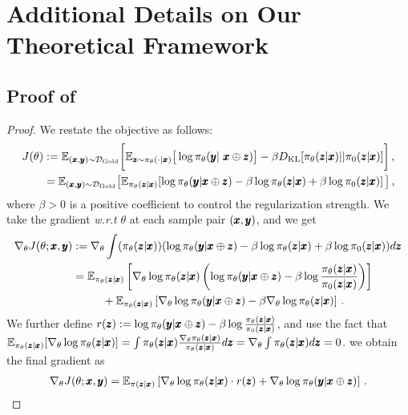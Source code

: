 \section{Additional Details on Our Theoretical Framework}
\subsection{Proof of }
\label{app:proof1}
\begin{proof}
We restate the objective as follows:
\begin{align*}
    J(\theta) &:= \mathbb{E}_{(\pmb{x}, \pmb{y})\sim \mathcal{D}_{\text{Gold}}} \bigg[\mathbb{E}_{\pmb{z} \sim \pi_{\theta}(\cdot | \pmb{x})}\big[\log \pi_{\theta}(\pmb{y} | ~\pmb{x}\oplus \pmb{z})\big]  - \beta D_{\mathrm{KL}}[\pi_\theta(\pmb{z} |\pmb{x})|| \pi_0(\pmb{z} | \pmb{x})]  \bigg]\,, \\
    & =\mathbb{E}_{(\pmb{x}, \pmb{y}) \sim \mathcal{D}_{\text{Gold}}}\big[\mathbb{E}_{\pi_\theta(\pmb{z}|\pmb{x})} [\log \pi_\theta (\pmb{y} | \pmb{x}\oplus \pmb{z}) -\beta \log \pi_\theta (\pmb{z} | \pmb{x}) + \beta \log \pi_{0}(\pmb{z} |\pmb{x})] \,\big]\,,
\end{align*}
where $\beta > 0$ is a positive coefficient to control the regularization strength.  
We take the gradient \textit{w.r.t} $\theta$ at each sample pair $(\pmb{x}, \pmb{y})$, and we get 
\begin{align*}
    \nabla_\theta J(\theta; \pmb{x}, \pmb{y}) &:= \nabla_\theta \int (\pi_\theta(\pmb{z} | \pmb{x}))( \log \pi_\theta (\pmb{y} | \pmb{x}\oplus \pmb{z}) -\beta \log \pi_\theta (\pmb{z} | \pmb{x}) + \beta\log \pi_{0}(\pmb{z} |\pmb{x}) )d\pmb{z} \\
    &= \mathbb{E}_{\pi_\theta(\pmb{z}|\pmb{x})}\left[\nabla_\theta \log \pi_\theta (\pmb{z} | \pmb{x})\left(\log \pi_\theta(\pmb{y} | \pmb{x} \oplus \pmb{z}) - \beta \log \frac{\pi_\theta(\pmb{z} | \pmb{x})}{\pi_{0}(\pmb{z} | \pmb{x})}\right)\right] \\
    &~~~~~~~~ + \mathbb{E}_{\pi_\theta(\pmb{z} |\pmb{x})}\left[\nabla_\theta \log \pi_\theta (\pmb{y} | \pmb{x} \oplus \pmb{z}) - \beta \nabla_\theta\log\pi_\theta (\pmb{z} |\pmb{x})\right]\,.
\end{align*}
We further define $r(\pmb{z}) := \log \pi_\theta (\pmb{y} | \pmb{x} \oplus \pmb{z}) - \beta \log \frac{\pi_{\theta}(\pmb{z} | \pmb{x})}{\pi_{0}(\pmb{z} | \pmb{x})}$, and use the fact that $\mathbb{E}_{\pi_\theta(\pmb{z} |\pmb{x})}[\nabla_\theta \log \pi_\theta(\pmb{z} | \pmb{x})] = \int \pi_\theta(\pmb{z} | \pmb{x})\frac{\nabla_\theta \pi_\theta(\pmb{z} | \pmb{x})}{\pi_\theta(\pmb{z} | \pmb{x})}d\pmb{z} = \nabla_\theta\int \pi_\theta(\pmb{z} | \pmb{x})d\pmb{z} = 0$. we obtain the final gradient as
\begin{align*}
    \nabla_\theta J(\theta; \px, \py) = \E_{\pi(\pz | \px)}\left[\nabla_\theta \log\pi_\theta(\pz | \px) \cdot r(\pz) + \nabla_\theta \log \pi_\theta (\py | \px \oplus \pz)\right]\,.

\end{align*}
\end{proof}
